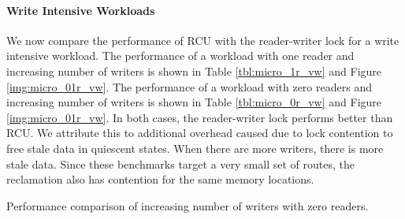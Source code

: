 \documentclass[a4paper]{article}
\begin{document}
\paragraph{Write Intensive Workloads}
We now compare the performance of RCU with the reader-writer lock for a write intensive workload. The performance of a workload with one reader and increasing number of writers is shown in Table \ref{tbl:micro_1r_vw} and Figure \ref{img:micro_01r_vw}. The performance of a workload with zero readers and increasing number of writers is shown in Table \ref{tbl:micro_0r_vw} and Figure \ref{img:micro_01r_vw}. In both cases, the reader-writer lock performs better than RCU. We attribute this to additional overhead caused due to lock contention to free stale data in quiescent states. When there are more writers, there is more stale data. Since these benchmarks target a very small set of routes, the reclamation also has contention for the same memory locations.

\begin{table}[tph]
\begin{center}

\end{center}
\label{tbl:micro_0r_vw}
\caption{Performance comparison of increasing number of writers with zero readers.}
\end{table}
\end{document}
